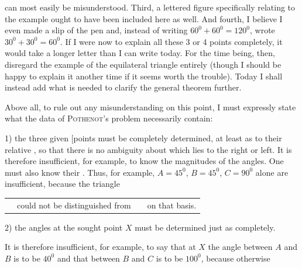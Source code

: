 %
can most easily be misunderstood. Third, a lettered figure specifically relating to the example ought to have been included here as well. And fourth, I believe I even made a slip of the pen and, instead of writing $60^0+60^0=120^0$, wrote $30^0+30^0=60^0$. If I were now to explain all these 3 or 4 points completely, it would take a longer letter than I can write today. For the time being, then, disregard the example of the equilateral triangle entirely (though I should be happy to explain it another time if it seems worth the trouble). Today I shall instead add what is needed to clarify the general theorem further.

Above all, to rule out any misunderstanding on this point, I must expressly state what the data of \textsc{Pothenot}'s problem necessarily contain:

1) the three given [points must be completely determined, at least as to their relative , so that there is no ambiguity about which lies to the right or left. It is therefore insufficient, for example, to know the magnitudes of the angles. One must also know their . Thus, for example, $A=45^0$, $B=45^0$, $C=90^0$ alone are insufficient, because the triangle

\begin{center}\begin{tabular}{c@{\quad}c@{\quad}c@{\quad}l}&could not be distinguished from&&on that basis.\end{tabular}\end{center}

2) the angles at the sought point $X$ must be determined just as completely.

It is therefore insufficient, for example, to say that at $X$ the angle between $A$ and $B$ is to be $40^0$ and that between $B$ and $C$ is to be $100^0$, because otherwise

\begin{center}\hspace{.8cm}\end{center}

